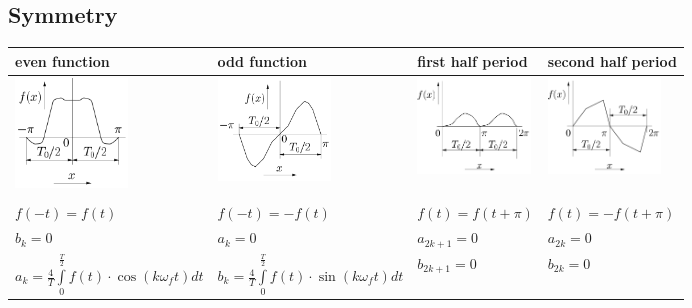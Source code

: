 	\subsection{Symmetry}
		\begin{tabular}{|p{4.3cm}|p{4.3cm}|p{4.4cm}|p{4.4cm}|}
         	\hline
        	\textbf{even function} & \textbf{odd function} &
        	\textbf{first half period} & \textbf{second half period}\\
        	\hline
        	\includegraphics[width=3cm]{Content/03_transforms/gerade_funktion.png}&
        	\includegraphics[width=3cm]{Content/03_transforms/ungerade_funktion.png}&
 			\includegraphics[width=3cm]{Content/03_transforms/halbperiode_1.png}&
			\includegraphics[width=3cm]{Content/03_transforms/halbperiode_2.png}\\
			\hline & & & \\
   			$f(-t)=f(t)$ & $f(-t)=-f(t)$ & $f(t)=f(t+\pi)$ & $f(t)=-f(t+\pi)$\\
   			$b_k=0$ & $a_k=0$ & $a_{2k+1}=0$ & $a_{2k}=0$\\
   			$a_k = \frac{4}{T} \int\limits_0^{\frac{T}{2}} f(t) \cdot \cos(k \omega_f
   			t) dt$ &
   			$b_k =  \frac{4}{T} \int\limits_0^{\frac{T}{2}} f(t) \cdot
			\sin(k \omega_f t) dt$ &
			$b_{2k+1}=0$ & $b_{2k}=0$\\
			\hline
      	\end{tabular}

